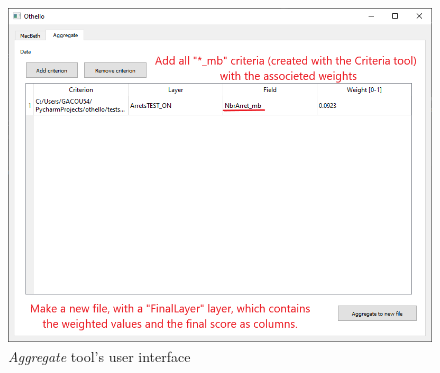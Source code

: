 \documentclass[11pt]{article}
\begin{document}
\begin{figure}[H]
    \includegraphics[width=\linewidth]{../images/aggregate_tool.png}
    \caption{\textit{Aggregate} tool's user interface}
\label{fig:aggregate-ui}

\end{figure}
\end{document}
